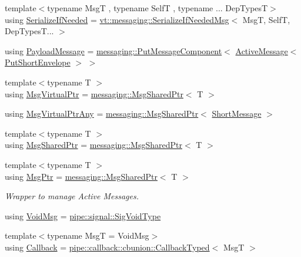 \begin{DoxyCompactItemize}
\item 
{\footnotesize template$<$typename MsgT , typename SelfT , typename ... Dep\+TypesT$>$ }\\using \hyperlink{namespacevt_a0a4ad8c256fcffa564e9fa7800e4b495}{Serialize\+If\+Needed} = \hyperlink{structvt_1_1messaging_1_1_serialize_if_needed_msg}{vt\+::messaging\+::\+Serialize\+If\+Needed\+Msg}$<$ MsgT, SelfT, Dep\+Types\+T... $>$
\item 
using \hyperlink{namespacevt_a89a92229c5622b855c02c549f83a1a68}{Payload\+Message} = \hyperlink{structvt_1_1messaging_1_1_put_message_component}{messaging\+::\+Put\+Message\+Component}$<$ \hyperlink{namespacevt_a00eb67bd138395b6a4f744fab3fa0678}{Active\+Message}$<$ \hyperlink{namespacevt_a8d7a7de9e76bfea1600009a775b7298c}{Put\+Short\+Envelope} $>$ $>$
\item 
{\footnotesize template$<$typename T $>$ }\\using \hyperlink{namespacevt_a82b5c92ea7ca3ddd2e8a2e27df87fa1a}{Msg\+Virtual\+Ptr} = \hyperlink{structvt_1_1messaging_1_1_msg_shared_ptr}{messaging\+::\+Msg\+Shared\+Ptr}$<$ T $>$
\item 
using \hyperlink{namespacevt_a54674b9f819f4f3a652c6f78d9b62aaf}{Msg\+Virtual\+Ptr\+Any} = \hyperlink{structvt_1_1messaging_1_1_msg_shared_ptr}{messaging\+::\+Msg\+Shared\+Ptr}$<$ \hyperlink{namespacevt_a1125ac1da6c0bbf141e0ea0739d7602d}{Short\+Message} $>$
\item 
{\footnotesize template$<$typename T $>$ }\\using \hyperlink{namespacevt_ab2b3d506ec8e8d1540aede826d84a239}{Msg\+Shared\+Ptr} = \hyperlink{structvt_1_1messaging_1_1_msg_shared_ptr}{messaging\+::\+Msg\+Shared\+Ptr}$<$ T $>$
\item 
{\footnotesize template$<$typename T $>$ }\\using \hyperlink{namespacevt_a9f5ebd62ee9d6dd8829e3e1cc4f858e9}{Msg\+Ptr} = \hyperlink{structvt_1_1messaging_1_1_msg_shared_ptr}{messaging\+::\+Msg\+Shared\+Ptr}$<$ T $>$
\begin{DoxyCompactList}\small\item\em Wrapper to manage Active Messages. \end{DoxyCompactList}\item 
using \hyperlink{namespacevt_ae108c204035ac2513c8d09e6971a4a31}{Void\+Msg} = \hyperlink{namespacevt_1_1pipe_1_1signal_acbe257d1ae44f20fa9fd9b6ed3057caf}{pipe\+::signal\+::\+Sig\+Void\+Type}
\item 
{\footnotesize template$<$typename MsgT  = Void\+Msg$>$ }\\using \hyperlink{namespacevt_a36db99df4c973d48b1118a293fff533f}{Callback} = \hyperlink{structvt_1_1pipe_1_1callback_1_1cbunion_1_1_callback_typed}{pipe\+::callback\+::cbunion\+::\+Callback\+Typed}$<$ MsgT $>$

\end{DoxyCompactItemize}
